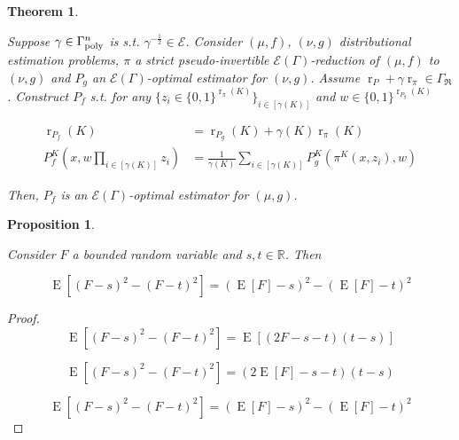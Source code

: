 \documentclass{article}
\numberwithin{equation}{section}
\theoremstyle{definition}
\theoremstyle{plain}
\newtheorem{theorem}{Theorem}[section]
\newtheorem{proposition}{Proposition}[section]
\newcommand{\Bool}{\{0,1\}}
\DeclareMathOperator{\E}{E}
\DeclareMathOperator{\R}{r}
\newcommand{\Reals}{\mathbb{R}}
\newcommand{\GrowR}{\Gamma_{\mathfrak{R}}}
\newcommand{\Fall}{\mathcal{E}}
\newcommand{\EG}{\Fall(\Gamma)}
\newcommand{\BoolR}[1]{\Bool^{\R_{#1}(K)}}
\newcommand{\GammaPoly}{\Gamma_{\textnormal{poly}}}
\begin{document}
\begin{samepage}
\begin{theorem}
\label{thm:sp_reduce}

Suppose $\gamma \in \GammaPoly^n$ is s.t. $\gamma^{-\frac{1}{2}} \in \Fall$. Consider $(\mu,f)$, $(\nu,g)$ distributional estimation problems, $\pi$ a strict pseudo-invertible $\EG$-reduction of $(\mu, f)$ to $(\nu, g)$ and $P_g$ an $\EG$-optimal estimator for $(\nu, g)$. Assume $\R_P + \gamma \R_\pi \in \GrowR$. Construct ${P_f}$  s.t. for any ${\{z_i \in \BoolR{\pi}\}_{i \in [\gamma(K)]}}$ and ${w \in \BoolR{P_g}}$

\begin{align}
\label{eqn:thm__sp_reduce__rpf}\R_{P_f}(K) &= \R_{P_g}(K) + \gamma(K) \R_\pi(K) \\
\label{eqn:thm__sp_reduce__pf}P_f^K(x, w \prod_{i \in [\gamma(K)]} z_i) &= \frac{1}{\gamma(K)}\sum_{i \in [\gamma(K)]} P_g^K(\pi^K(x,z_i),w)
\end{align}


Then, $P_f$ is an $\EG$-optimal estimator for ${(\mu,g)}$.

\end{theorem}
\end{samepage}

\begin{samepage}
\begin{proposition}
\label{prp:ev_diff_sq}

Consider ${F}$ a bounded random variable and ${s,t \in \Reals}$. Then

\begin{equation}
\E[(F - s)^2 - (F - t)^2] = (\E[F] - s)^2 - (\E[F] - t)^2
\end{equation}

\end{proposition}
\end{samepage}

\begin{proof}

\[\E[(F - s)^2 - (F - t)^2] = \E[(2F - s - t)(t-s)]\]

\[\E[(F - s)^2 - (F - t)^2] = (2\E[F] - s - t)(t-s)\]

\[\E[(F - s)^2 - (F - t)^2] = (\E[F] - s)^2 - (\E[F] - t)^2\]
%
\end{proof}
\end{document}
